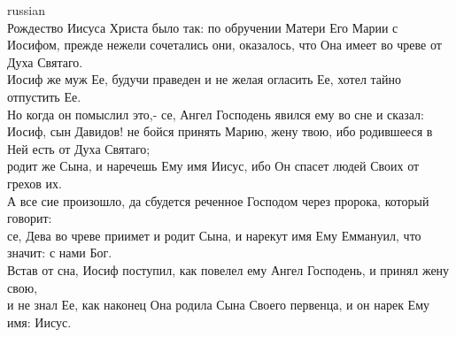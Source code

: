 \documentclass[10pt]{article} %
\begin{document}
{\begin{minipage}[t]{0.45\textwidth}
\begin{otherlanguage*}{russian}
\\
Рождество Иисуса Христа было так: по обручении Матери Его Марии с Иосифом, прежде нежели сочетались они, оказалось, что Она имеет во чреве от Духа Святаго.
\\
Иосиф же муж Ее, будучи праведен и не желая огласить Ее, хотел тайно отпустить Ее.
\\
Но когда он помыслил это,- се, Ангел Господень явился ему во сне и сказал: Иосиф, сын Давидов! не бойся принять Марию, жену твою, ибо родившееся в Ней есть от Духа Святаго;
\\
родит же Сына, и наречешь Ему имя Иисус, ибо Он спасет людей Своих от грехов их.
\\
А все сие произошло, да сбудется реченное Господом через пророка, который говорит:
\\
се, Дева во чреве приимет и родит Сына, и нарекут имя Ему Еммануил, что значит: с нами Бог.
\\
Встав от сна, Иосиф поступил, как повелел ему Ангел Господень, и принял жену свою,
\\
и не знал Ее, как наконец Она родила Сына Своего первенца, и он нарек Ему имя: Иисус.
\end{otherlanguage*}
\end{minipage}
\hfill
\begin{minipage}[t]{0.45\textwidth}


\end{minipage}}
\end{document}
